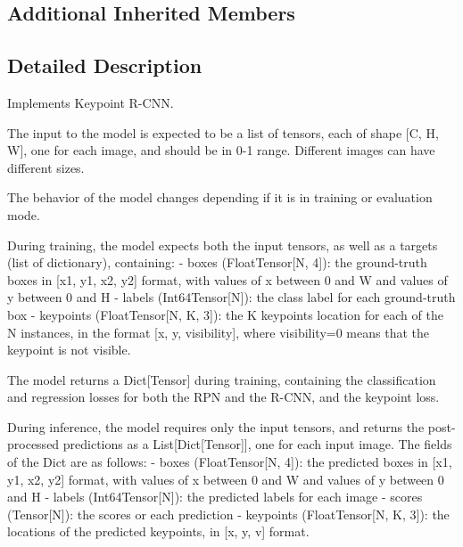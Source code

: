 \subsection*{Additional Inherited Members}


\subsection{Detailed Description}
\begin{DoxyVerb}Implements Keypoint R-CNN.

The input to the model is expected to be a list of tensors, each of shape [C, H, W], one for each
image, and should be in 0-1 range. Different images can have different sizes.

The behavior of the model changes depending if it is in training or evaluation mode.

During training, the model expects both the input tensors, as well as a targets (list of dictionary),
containing:
    - boxes (FloatTensor[N, 4]): the ground-truth boxes in [x1, y1, x2, y2] format, with values of x
      between 0 and W and values of y between 0 and H
    - labels (Int64Tensor[N]): the class label for each ground-truth box
    - keypoints (FloatTensor[N, K, 3]): the K keypoints location for each of the N instances, in the
      format [x, y, visibility], where visibility=0 means that the keypoint is not visible.

The model returns a Dict[Tensor] during training, containing the classification and regression
losses for both the RPN and the R-CNN, and the keypoint loss.

During inference, the model requires only the input tensors, and returns the post-processed
predictions as a List[Dict[Tensor]], one for each input image. The fields of the Dict are as
follows:
    - boxes (FloatTensor[N, 4]): the predicted boxes in [x1, y1, x2, y2] format, with values of x
      between 0 and W and values of y between 0 and H
    - labels (Int64Tensor[N]): the predicted labels for each image
    - scores (Tensor[N]): the scores or each prediction
    - keypoints (FloatTensor[N, K, 3]): the locations of the predicted keypoints, in [x, y, v] format.


\end{DoxyVerb}
